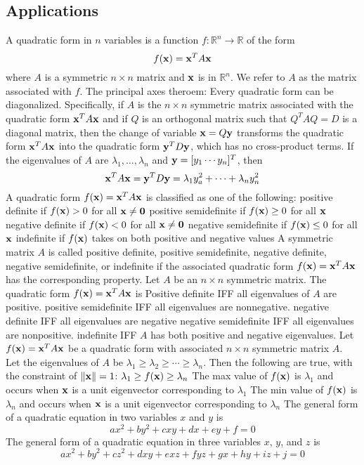 \documentclass{article}
\begin{document}
        \subsection{Applications}
        \begin{outline}
            \1 A quadratic form in $n$ variables is a function \(f:\mathbb R^n\to\mathbb R\) of the form \[f(\vb x)=\vb x^TA\vb x\] where $A$ is a symmetric \(n\times n\) matrix and \(\vb x\) is in \(\mathbb R^n\). We refer to $A$ as the matrix associated with $f$. 
            \1 The principal axes theroem: Every quadratic form can be diagonalized. Specifically, if $A$ is the \(n\times n\) symmetric matrix associated with the quadratic form \(\vb x^TA\vb x\) and if $Q$ is an orthogonal matrix such that \(Q^TAQ=D\) is a diagonal matrix, then the change of variable \(\vb x=Q\vb y\) transforms the quadratic form \(\vb x^TA\vb x\) into the quadratic form \(\vb y^TD\vb y\), which has no cross-product terms. If the eigenvalues of $A$ are \(\lambda_1,\ldots,\lambda_n\) and \(\vb y=[y_1\cdots y_n]^T\), then \[\vb x^TA\vb x=\vb y^TD\vb y=\lambda_1y_a^2+\cdots+\lambda_ny_n^2\]
            \1 A quadratic form \(f(\vb x)=\vb x^TA\vb x\) is classified as one of the following: 
                \2 positive definite if \(f(\vb x)>0\) for all \(\vb x\neq\vb 0\)
                \2 positive semidefinite if \(f(\vb x)\geq0\) for all \(\vb x\)
                \2 negative definite if \(f(\vb x)<0\) for all \(\vb x\neq\vb 0\)
                \2 negative semidefinite if \(f(\vb x)\leq0\) for all \(\vb x\)
                \2 indefinite if \(f(\vb x)\) takes on both positive and negative values
            \1 A symmetric matrix $A$ is called positive definite, positive semidefinite, negative definite, negative semidefinite, or indefinite if the associated quadratic form \(f(\vb x)=\vb x^TA\vb x\) has the corresponding property. 
            \1 Let $A$ be an \(n\times n\) symmetric matrix. The quadratic form \(f(\vb x)=\vb x^TA\vb x\) is 
                \2 Positive definite IFF all eigenvalues of $A$ are positive. 
                \2 positive semidefinite IFF all eigenvalues are nonnegative. 
                \2 negative definite IFF all eigenvalues are negative
                \2 negative semidefinite IFF all eigenvalues are nonpositive. 
                \2 indefinite IFF $A$ has both positive and negative eigenvalues. 
            \1 Let \(f(\vb x)=\vb x^TA\vb x\) be a quadratic form with associated \(n\times n\) symmetric matrix $A$. Let the eigenvalues of $A$ be \(\lambda_1\geq\lambda_2\geq\cdots\geq\lambda_n\). Then the following are true, with the constraint of \(\|\vb x\|=1\): 
                \2 \(\lambda_1\geq f(\vb x)\geq\lambda_n\)
                \2 The max value of \(f(\vb x)\) is \(\lambda_1\) and occurs when \(\vb x\) is a unit eigenvector corresponding to \(\lambda_1\)
                \2 The min value of \(f(\vb x)\) is \(\lambda_n\) and occurs when \(\vb x\) is a unit eigenvector corresponding to \(\lambda_n\)
            \1 The general form of a quadratic equation in two variables $x$ and $y$ is \[ax^2+by^2+cxy+dx+ey+f=0\]
            \1 The general form of a quadratic equation in three variables $x$, $y$, and $z$ is \[ax^2+by^2+cz^2+dxy+exz+fyz+gx+hy+iz+j=0\]

        \end{outline}
\end{document}
